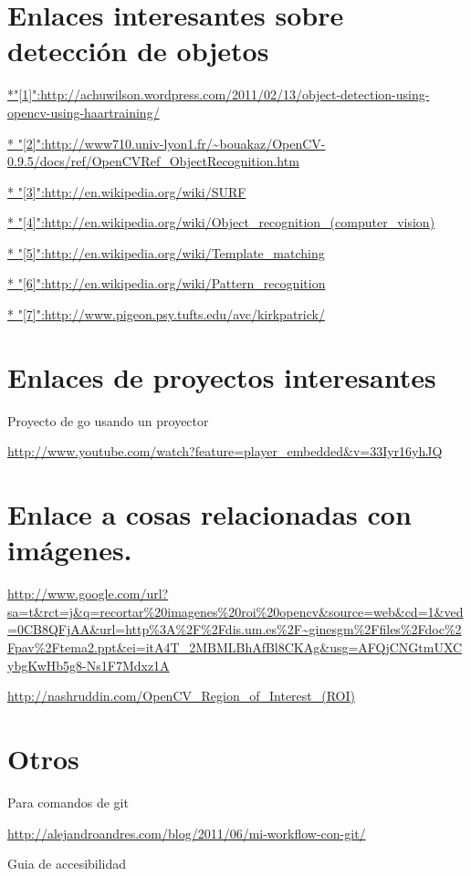 \documentclass[12pt,a4paper]{report}
\begin{document}
\section{Enlaces interesantes sobre detección de objetos}

\url{*"[1]":http://achuwilson.wordpress.com/2011/02/13/object-detection-using-opencv-using-haartraining/}

\url{* "[2]":http://www710.univ-lyon1.fr/~bouakaz/OpenCV-0.9.5/docs/ref/OpenCVRef_ObjectRecognition.htm}

\url{* "[3]":http://en.wikipedia.org/wiki/SURF}

\url{* "[4]":http://en.wikipedia.org/wiki/Object_recognition_(computer_vision)}

\url{* "[5]":http://en.wikipedia.org/wiki/Template_matching}

\url{* "[6]":http://en.wikipedia.org/wiki/Pattern_recognition}

\url{* "[7]":http://www.pigeon.psy.tufts.edu/avc/kirkpatrick/}

\section{Enlaces de proyectos interesantes}

Proyecto de go usando un proyector

\url{http://www.youtube.com/watch?feature=player_embedded&v=33Iyr16yhJQ}


\section{Enlace a cosas relacionadas con imágenes.} 

\url{http://www.google.com/url?sa=t&rct=j&q=recortar%20imagenes%20roi%20opencv&source=web&cd=1&ved=0CB8QFjAA&url=http%3A%2F%2Fdis.um.es%2F~ginesgm%2Ffiles%2Fdoc%2Fpav%2Ftema2.ppt&ei=itA4T_2MBMLBhAfBl8CKAg&usg=AFQjCNGtmUXCybgKwHb5g8-Ns1F7Mdxz1A}

\url{http://nashruddin.com/OpenCV_Region_of_Interest_(ROI)}

\section{Otros}

Para comandos de git

\url{http://alejandroandres.com/blog/2011/06/mi-workflow-con-git/}

Guia de accesibilidad 
\end{document}
